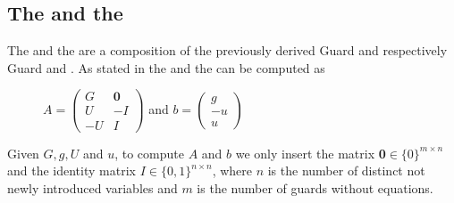 \subsection{The \iterationmatrix and the \iterationconstants}
The \iterationmatrix and the \iterationconstants are a composition of the previously derived Guard and \updatematrix respectively Guard and \updateconstants. \newline
As stated in  the \iterationmatrix and the \iterationconstants can be computed as
\begin{figure}[H]
	\centering
	$A = \begin{pmatrix} G & \textbf{0} \\ U & -I \\ -U & I \end{pmatrix}$ and $b = \begin{pmatrix} g \\ -u \\ u \end{pmatrix}$ \cite{leike2014geometric}
\end{figure}
Given $G, g, U$ and $u$, to compute $A$ and $b$ we only insert the matrix \textbf{0}$ \in \{0\}^{m\times n}$ and the identity matrix $I \in \{0,1\}^{n\times n}$, where $n$ is the number of distinct not newly introduced variables and $m$ is the number of guards without equations.

